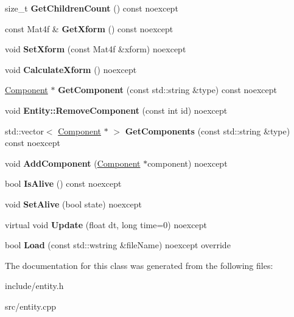 \begin{DoxyCompactItemize}
size\+\_\+t {\bfseries Get\+Children\+Count} () const noexcept
\item 
\mbox{\label{class_blade_1_1_entity_a3d3aeafc92f2e8f8b510a94ad01f6361}} 
const Mat4f \& {\bfseries Get\+Xform} () const noexcept
\item 
\mbox{\label{class_blade_1_1_entity_ad69a2e7b6f43cf2965150c17eb1df15d}} 
void {\bfseries Set\+Xform} (const Mat4f \&xform) noexcept
\item 
\mbox{\label{class_blade_1_1_entity_ad6476f0fea2763050744f606bae27a57}} 
void {\bfseries Calculate\+Xform} () noexcept
\item 
\mbox{\label{class_blade_1_1_entity_a8b13a51096740b31ae205eb2877afc15}} 
\hyperlink{class_blade_1_1_component}{Component} $\ast$ {\bfseries Get\+Component} (const std\+::string \&type) const noexcept
\item 
\mbox{\label{class_blade_1_1_entity_aa5a6d79575c25056f8e809277d456a3c}} 
void {\bfseries Entity\+::\+Remove\+Component} (const int id) noexcept
\item 
\mbox{\label{class_blade_1_1_entity_a03a193877e136ceb85909a3bc0944968}} 
std\+::vector$<$ \hyperlink{class_blade_1_1_component}{Component} $\ast$ $>$ {\bfseries Get\+Components} (const std\+::string \&type) const noexcept
\item 
\mbox{\label{class_blade_1_1_entity_acf8c99d68959692c47696a1b0a4a3454}} 
void {\bfseries Add\+Component} (\hyperlink{class_blade_1_1_component}{Component} $\ast$component) noexcept
\item 
\mbox{\label{class_blade_1_1_entity_a97c777c4554eb238b566615b7116ee92}} 
bool {\bfseries Is\+Alive} () const noexcept
\item 
\mbox{\label{class_blade_1_1_entity_a215a8ed4c4fb90a6aa2dc6cf7ca28a1a}} 
void {\bfseries Set\+Alive} (bool state) noexcept
\item 
\mbox{\label{class_blade_1_1_entity_a472f9a9c9c2cd4e963b28fe9f7e7b9f4}} 
virtual void {\bfseries Update} (float dt, long time=0) noexcept
\item 
\mbox{\label{class_blade_1_1_entity_a1e23e9402a5c5a1d266c208c7637c539}} 
bool {\bfseries Load} (const std\+::wstring \&file\+Name) noexcept override
\end{DoxyCompactItemize}


The documentation for this class was generated from the following files\+:\begin{DoxyCompactItemize}
\item 
include/entity.\+h\item 
src/entity.\+cpp\end{DoxyCompactItemize}
